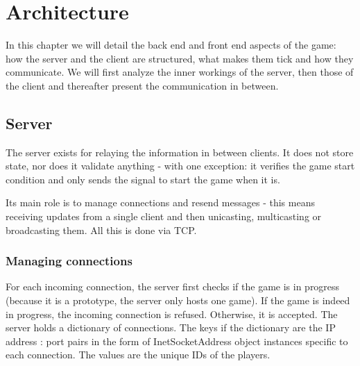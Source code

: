 \section{Architecture}

In this chapter we will detail the back end and front end aspects of the game:
how the server and the client are structured, what makes them tick and how they
communicate. We will first analyze the inner workings of the server, then those
of the client and thereafter present the communication in between.\newline

\subsection{Server}


The server exists for relaying the information in between clients. It does not
store state, nor does it validate anything - with one exception: it verifies the
game start condition and only sends the signal to start the game when it
is.\newline

Its main role is to manage connections and resend messages - this means
receiving updates from a single client and then unicasting, multicasting or
broadcasting them. All this is done via TCP.\newline

\subsubsection{Managing connections}

For each incoming connection, the server first checks if the game is
in progress (because it is a prototype, the server only hosts one game). If
the game is indeed in progress, the incoming connection is refused. Otherwise,
it is accepted. The server holds a dictionary of connections.
The keys if the dictionary are the IP address : port pairs in the form of
InetSocketAddress object instances specific to each connection. The values
are the unique IDs of the players.\newline

